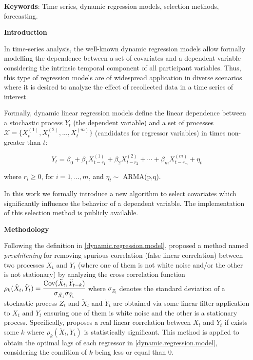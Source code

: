 \documentclass[twoside]{article}
\begin{document}
\vspace{0.4cm}

\textbf{Keywords}: Time series, dynamic regression models, selection methods, forecasting.

\vspace{0.4cm}

\begin{center}
\textbf{Introduction}
\end{center}


In time-series analysis, the well-known dynamic regression models allow formally modelling the dependence between a set of covariates and a dependent variable considering the intrinsic temporal component of all participant variables. Thus, this type of regression models are of widespread application in diverse scenarios where it is desired to analyze the effect of recollected data in a time series of interest. 

Formally, dynamic linear regression models define the linear dependence between a stochastic process $Y_t$ (the dependent variable) and a set of processes  $\mathcal{X}=\{ X_t^{(1)}, X_t^{(2)}, ..., X_t^{(m)}\}$ (candidates for regressor variables) in times non-greater than $t$:

\begin{equation}\label{dynamic.regression.model}
Y_t = \beta_0 + \beta_1 X^{(1)}_{t-r_1} + \beta_2 X^{(2)}_{t-r_2} + \cdots + \beta_m  X^{(m)}_{t-r_m} + \eta_t 
\end{equation}

\noindent where $r_i \geq 0$, for $i=1,...,m$, and $\eta_t \sim$ ARMA(p,q).

In this work we formally introduce a new algorithm to select covariates which significantly influence the behavior of a dependent variable. The implementation of this selection method is publicly available.




\begin{center}
\textbf{Methodology}
\end{center}

Following the definition in \ref{dynamic.regression.model}, \cite{cryer2008time} proposed a method named \textit{prewhitening} for removing spurious correlation (false linear correlation) between two processes $X_t$ and $Y_t$ (where one of them is not white noise and/or the other is not stationary) by analyzing the cross correlation function $\rho_k(\ddot{X}_t, \ddot{Y}_t) =  \cfrac{\text{Cov}(\ddot{X}_t, \ddot{Y}_{t-k})}{\sigma_{\ddot{X}_t} \sigma_{\ddot{Y}_t}} $ where $\sigma_{Z_t}$ denotes the standard deviation of a stochastic process $Z_t$ and $\ddot{X}_t$ and $\ddot{Y}_t$ are obtained via some linear filter application to $X_t$ and $Y_t$ ensuring one of them is white noise and the other is a stationary process. Specifically, \cite{cryer2008time} proposes a real linear correlation between $X_t$ and $Y_t$ if exists some $k$ where $\rho_k(\ddot{X}_t, \ddot{Y}_t)$ is statistically significant. This method is applied to obtain the optimal lags of each regressor in \ref{dynamic.regression.model}, considering the condition of $k$ being less or equal than $0$.
\end{document}
